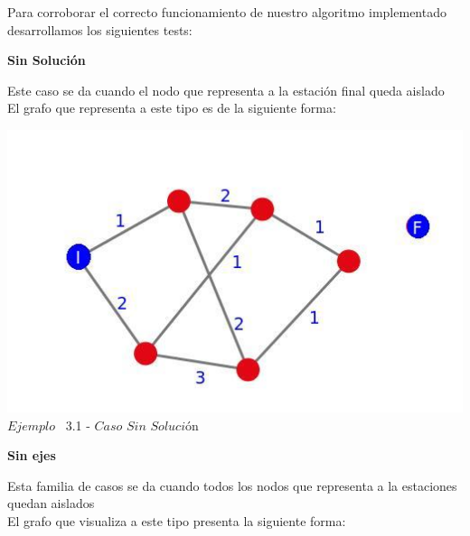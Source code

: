 \indent Para corroborar el correcto funcionamiento de nuestro algoritmo implementado desarrollamos los siguientes tests:\\


\begin{center}
 \textbf{Sin Soluci\'on}
\end{center}

Este caso se da cuando el nodo que representa a la estaci\'on final queda aislado  \\

El grafo que representa a este tipo es de la siguiente forma:\\

\vspace*{0.3cm} \vspace*{0.3cm}
  \begin{center}
 \includegraphics[scale=0.5]{./EJ3/grafoSinSolucion.jpeg}
 \\{$Ejemplo$ \ 3.1 - $Caso$ $Sin$ $Soluci$\'on}
  \end{center}
  \vspace*{0.3cm}
  
\begin{center}
 \textbf{Sin ejes}
\end{center}

Esta familia de casos se da cuando todos los nodos que representa a la estaciones quedan aislados  \\

El grafo que visualiza a este tipo presenta la siguiente forma:\\

